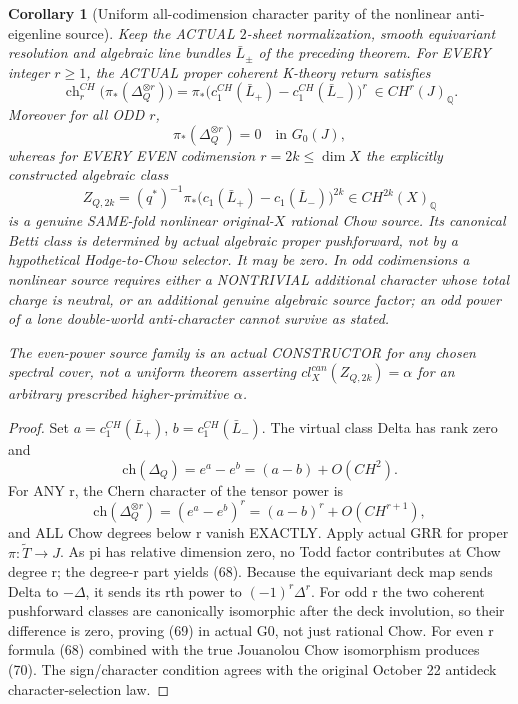 \documentclass[11pt]{article}
\newtheorem{corollary}[theorem]{Corollary}
\begin{document}
\begin{corollary}[Uniform all-codimension character parity of the nonlinear anti-eigenline source]
Keep the ACTUAL $2$-sheet
normalization, smooth equivariant
resolution and algebraic line
bundles $\bar L_\pm$ of the
preceding theorem.
For EVERY integer $r\ge1$,
the ACTUAL proper coherent
K-theory return satisfies
\[
 \boxed{
 \operatorname{ch}^{CH}_r
      \bigl(\pi_*(\Delta_Q^{\otimes r})\bigr)
   =\pi_*\bigl(
      c_1^{CH}(\bar L_+)
       -c_1^{CH}(\bar L_-)
               \bigr)^r
       \ \in CH^r(J)_{\mathbb Q}.
 }                                               \tag{68}
\]
Moreover for all ODD $r$,
\[
 \boxed{\pi_*(\Delta_Q^{\otimes r})=0
                      \quad\text{in }G_0(J),}    \tag{69}
\]
whereas for EVERY EVEN codimension
$r=2k\le\dim X$ the explicitly
constructed algebraic class
\[
 \boxed{
 Z_{Q,2k}=(q^*)^{-1}
     \pi_*\bigl(
          c_1(\bar L_+)-c_1(\bar L_-)
                 \bigr)^{2k}
       \in CH^{2k}(X)_{\mathbb Q}
 }                                               \tag{70}
\]
is a genuine SAME-fold nonlinear
original-$X$ rational Chow source.
Its canonical Betti class is
determined by actual algebraic
proper pushforward, not by
a hypothetical Hodge-to-Chow
selector. It may be zero.
In odd codimensions a nonlinear
source requires either a
NONTRIVIAL additional character
whose total charge is neutral,
or an additional genuine algebraic
source factor; an odd power of
a lone double-world anti-character
cannot survive as stated.

The even-power source family
is an actual CONSTRUCTOR for any
chosen spectral cover, not a
uniform theorem asserting
$cl_X^{can}(Z_{Q,2k})=\alpha$
for an arbitrary prescribed
higher-primitive $\alpha$.
\end{corollary}
\begin{proof}
Set $a=c_1^{CH}(\bar L_+)$,
$b=c_1^{CH}(\bar L_-)$.
The virtual class Delta has
rank zero and
\[
 \mathrm{ch}(\Delta_Q)=
     e^a-e^b=(a-b)+O(CH^2).
\]
For ANY r, the Chern character
of the tensor power is
\[
 \mathrm{ch}(\Delta_Q^{\otimes r})
   =(e^a-e^b)^r
   =(a-b)^r+O(CH^{r+1}),
\]
and ALL Chow degrees below r
vanish EXACTLY.
Apply actual GRR for proper
$\pi:\widetilde T\to J$.
As pi has relative
dimension zero, no Todd factor
contributes at Chow degree r;
the degree-r part yields (68).
Because the equivariant
deck map sends Delta to
$-\Delta$, it sends its rth
power to $(-1)^r\Delta^r$.
For odd r the two coherent
pushforward classes are
canonically isomorphic
after the deck involution,
so their difference is zero,
proving (69) in actual G0,
not just rational Chow.
For even r formula (68)
combined with the true
Jouanolou Chow isomorphism
produces (70).
The sign/character condition
agrees with the original
October 22 antideck
character-selection law.
\end{proof}
\end{document}
